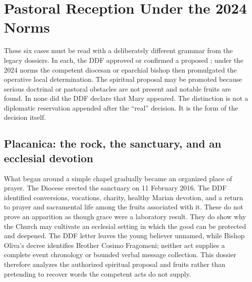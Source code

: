 \section{Pastoral Reception Under the 2024 Norms}

These six cases must be read with a deliberately different grammar from the legacy dossiers. In each, the DDF approved or confirmed a proposed ; under the 2024 norms the competent diocesan or eparchial bishop then promulgated the operative local determination. The spiritual proposal may be promoted because serious doctrinal or pastoral obstacles are not present and notable fruits are found. In none did the DDF declare that Mary appeared. The distinction is not a diplomatic reservation appended after the ``real'' decision. It is the form of the decision itself.

\subsection{Placanica: the rock, the sanctuary, and an ecclesial devotion}


What began around a simple chapel gradually became an organized place of prayer. The Diocese erected the sanctuary on 11 February 2016. The DDF identified conversions, vocations, charity, healthy Marian devotion, and a return to prayer and sacramental life among the fruits associated with it. These do not prove an apparition as though grace were a laboratory result. They do show why the Church may cultivate an ecclesial setting in which the good can be protected and deepened. The DDF letter leaves the young believer unnamed, while Bishop Oliva's decree identifies Brother Cosimo Fragomeni; neither act supplies a complete event chronology or bounded verbal message collection. This dossier therefore analyzes the authorized spiritual proposal and fruits rather than pretending to recover words the competent acts do not supply.

